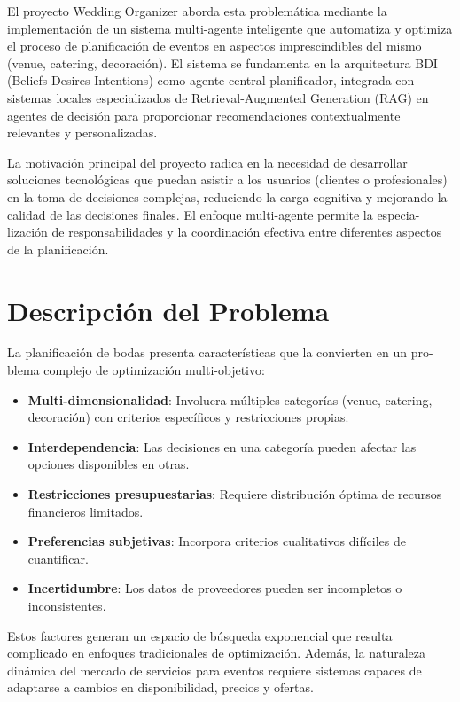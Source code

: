 \documentclass[runningheads,a4paper]{llncs}
\begin{document}
El proyecto Wedding Organizer aborda esta problemática mediante la implementación de un sistema multi-agente inteligente 
que automatiza y optimiza el proceso de planificación de eventos en aspectos imprescindibles del mismo (venue, catering, 
decoración). El sistema se fundamenta en la arquitectura BDI (Beliefs-Desires-Intentions) como agente central planificador, 
integrada con sistemas locales especializados de Retrieval-Augmented Generation (RAG) en agentes de decisión para 
proporcionar recomendaciones contextualmente relevantes y personalizadas.

La motivación principal del proyecto radica en la necesidad de desarrollar soluciones tecnológicas que puedan asistir a 
los usuarios (clientes o profesionales) en la toma de decisiones complejas, reduciendo la carga cognitiva y mejorando 
la calidad de las decisiones finales. El enfoque multi-agente permite la especia-lización de responsabilidades y la 
coordinación efectiva entre diferentes aspectos de la planificación.

\section{Descripción del Problema}

La planificación de bodas presenta características que la convierten en un pro-blema complejo de optimización multi-objetivo:

\begin{itemize}
    \item \textbf{Multi-dimensionalidad}: Involucra múltiples categorías (venue, catering, decoración) con criterios 
    específicos y restricciones propias.
    \item \textbf{Interdependencia}: Las decisiones en una categoría pueden afectar las opciones disponibles en otras.
    \item \textbf{Restricciones presupuestarias}: Requiere distribución óptima de recursos financieros limitados.
    \item \textbf{Preferencias subjetivas}: Incorpora criterios cualitativos difíciles de cuantificar.
    \item \textbf{Incertidumbre}: Los datos de proveedores pueden ser incompletos o inconsistentes.
\end{itemize}

Estos factores generan un espacio de búsqueda exponencial que resulta complicado en enfoques tradicionales de optimización. 
Además, la naturaleza dinámica del mercado de servicios para eventos requiere sistemas capaces de adaptarse a cambios en 
disponibilidad, precios y ofertas.
\end{document}
